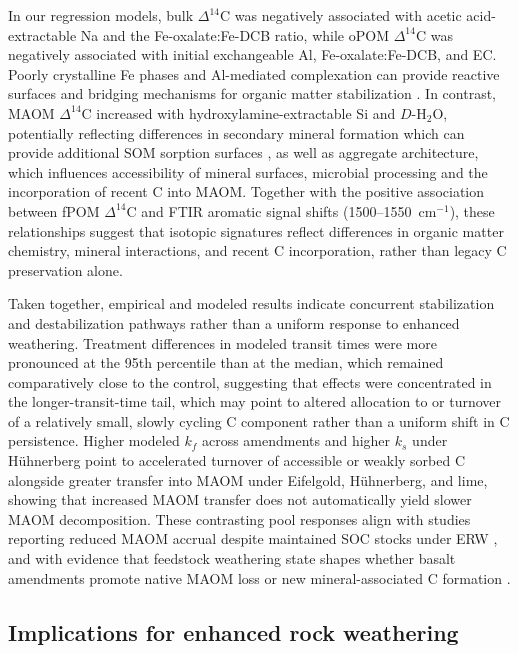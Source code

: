 \documentclass[preprint,12pt]{elsarticle}
\begin{document}
In our regression models, bulk $\Delta^{14}$C was negatively associated with acetic acid-extractable Na and the Fe-oxalate:Fe-DCB ratio, while oPOM $\Delta^{14}$C was negatively associated with initial exchangeable Al, Fe-oxalate:Fe-DCB, and EC. Poorly crystalline Fe phases and Al-mediated complexation can provide reactive surfaces and bridging mechanisms for organic matter stabilization \citep{Rasmussen2018,jiang2026molecular}. In contrast, MAOM $\Delta^{14}$C increased with hydroxylamine-extractable Si and $D$-H$_2$O, potentially reflecting differences in secondary mineral formation which can provide additional SOM sorption surfaces \citep{Behrens2015,sokol2024reduced,steinwidder2025beyond}, as well as aggregate architecture, which influences accessibility of mineral surfaces, microbial processing and the incorporation of recent C into MAOM. Together with the positive association between fPOM $\Delta^{14}$C and FTIR aromatic signal shifts (1500--1550~cm$^{-1}$), these relationships suggest that isotopic signatures reflect differences in organic matter chemistry, mineral interactions, and recent C incorporation, rather than legacy C preservation alone.

Taken together, empirical and modeled results indicate concurrent stabilization and destabilization pathways rather than a uniform response to enhanced weathering. Treatment differences in modeled transit times were more pronounced at the 95th percentile than at the median, which remained comparatively close to the control, suggesting that effects were concentrated in the longer-transit-time tail, which may point to altered allocation to or turnover of a relatively small, slowly cycling C component rather than a uniform shift in C persistence. Higher modeled $k_f$ across amendments and higher $k_s$ under H\"uhnerberg point to accelerated turnover of accessible or weakly sorbed C alongside greater transfer into MAOM under Eifelgold, H\"uhnerberg, and lime, showing that increased MAOM transfer does not automatically yield slower MAOM decomposition. These contrasting pool responses align with studies reporting reduced MAOM accrual despite maintained SOC stocks under ERW \citep{sokol2024reduced}, and with evidence that feedstock weathering state shapes whether basalt amendments promote native MAOM loss or new mineral-associated C formation \citep{Lei2026}.

\subsection{Implications for enhanced rock weathering}
\label{subsec:erw_implications}
\end{document}
